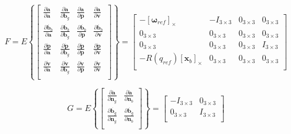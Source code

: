 \documentclass[a4paper]{paper}
\begin{document}
\begin{equation}
    F = E \left\{
        \left[
        \begin{matrix}
            \frac{\partial \dot{\bm{a}}}{\partial \bm{a}} &
            \frac{\partial \dot{\bm{a}}}{\partial \bm{b}_g} &
            \frac{\partial \dot{\bm{a}}}{\partial \bm{p}} &
            \frac{\partial \dot{\bm{a}}}{\partial \bm{v}}\\[0.3em]
            \frac{\partial \dot{\bm{b}_b}}{\partial \bm{a}} &
            \frac{\partial \dot{\bm{b}_b}}{\partial \bm{b}_g} &
            \frac{\partial \dot{\bm{b}_b}}{\partial \bm{p}} &
            \frac{\partial \dot{\bm{b}_b}}{\partial \bm{v}}\\[0.3em]
            \frac{\partial \dot{\bm{p}}}{\partial \bm{a}} &
            \frac{\partial \dot{\bm{p}}}{\partial \bm{b}_g} &
            \frac{\partial \dot{\bm{p}}}{\partial \bm{p}} &
            \frac{\partial \dot{\bm{p}}}{\partial \bm{v}}\\[0.3em]
            \frac{\partial \dot{\bm{v}}}{\partial \bm{a}} &
            \frac{\partial \dot{\bm{v}}}{\partial \bm{b}_g} &
            \frac{\partial \dot{\bm{v}}}{\partial \bm{p}} &
            \frac{\partial \dot{\bm{v}}}{\partial \bm{v}}\\
        \end{matrix}
        \right]
    \right\}
    = \left[
        \begin{matrix}
            -{[\bm{\omega}_{ref}]}_\times &
            -I_{3\times3}&
            0_{3\times3} &
            0_{3\times3}\\[0.3em]
            0_{3\times3} &
            0_{3\times3} &
            0_{3\times3} &
            0_{3\times3}\\[0.3em]
            0_{3\times3} &
            0_{3\times3} &
            0_{3\times3} &
            I_{3\times3}\\[0.3em]
            -R(q_{ref}){[\bm{x}_b]}_\times &
            0_{3\times3} &
            0_{3\times3} &
            0_{3\times3}\\
        \end{matrix}
        \right]
\end{equation}

\begin{equation}
    G = E \left\{
        \left[
        \begin{matrix}
            \frac{\partial \dot{\bm{a}}}{\partial \bm{n}_g} & \frac{\partial \dot{\bm{a}}}{\partial \bm{n}_b}\\[0.3em]
            \frac{\partial \dot{\bm{b}_g}}{\partial \bm{n}_g} & \frac{\partial \dot{\bm{b}_g}}{\partial \bm{n}_b}\\
        \end{matrix}
        \right]
    \right\}
    = \left[
        \begin{matrix}
            -I_{3\times3} & 0_{3\times3}\\[0.3em]
            0_{3\times3} & I_{3\times3}\\
        \end{matrix}
        \right]
\end{equation}


\clearpage
\nocite{*}
\printbibliography[prefixnumbers={RD}]
\clearpage
\end{document}
